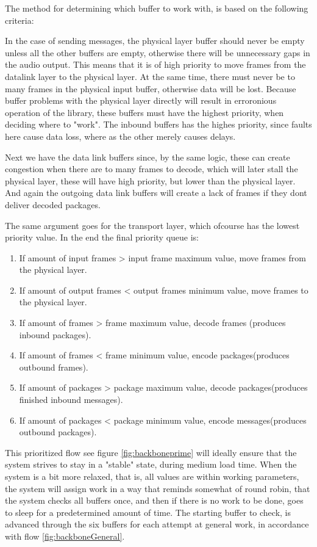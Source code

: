 The method for determining which buffer to work with, is based on the following criteria:

In the case of sending messages, the physical layer buffer should never be empty unless all the other buffers are empty, otherwise there will be unnecessary gaps in the audio output. This means that it is of high priority to move frames from the datalink layer to the physical layer.
At the same time, there must never be to many frames in the physical input buffer, otherwise data will be lost. Because buffer problems with the physical layer directly will result in erroronious operation of the library, these buffers must have the highest priority, when deciding where to "work". The inbound buffers has the highes priority, since faults here cause data loss, where as the other merely causes delays.

Next we have the data link buffers since, by the same logic, these can create congestion when there are to many frames to decode, which will later stall the physical layer, these will have high priority, but lower than the physical layer.
And again the outgoing data link buffers will create a lack of frames if they dont deliver decoded packages.

The same argument goes for the transport layer, which ofcourse has the lowest priority value.
 In the end the final priority queue is:

\begin{enumerate}
\item If amount of input frames > input frame maximum value, move frames from the physical layer.
\item If amount of output frames < output frames minimum value, move frames to the physical layer.
\item If amount of frames > frame maximum value, decode frames (produces inbound packages).
\item If amount of frames < frame minimum value, encode packages(produces outbound frames).
\item If amount of packages > package maximum value, decode packages(produces finished inbound messages).
\item If amount of packages < package minimum value, encode messages(produces outbound packages).
\end{enumerate}
This prioritized flow see figure \ref{fig:backboneprime} will ideally ensure that the system strives to stay in a "stable" state, during medium load time.
When the system is a bit more relaxed, that is, all values are within working parameters, the system will assign work in a way that reminds somewhat of round robin, that the system checks all buffers once, and then if there is no work to be done, goes to sleep for a predetermined amount of time. The starting buffer to check, is advanced through the six buffers for each attempt at general work, in accordance with flow \ref{fig:backboneGeneral}.

